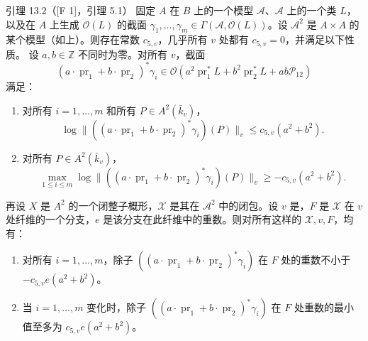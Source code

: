 \begin{statement}{引理 13.2（[F 1]，引理 5.1）}
固定 $A$ 在 $B$ 上的一个模型 $\mathscr A$、$\mathscr A$ 上的一个类 $L$，以及在 $A$ 上生成 $\mathcal O(L)$ 的截面 $\gamma_1,\ldots,\gamma_m\in\Gamma(\mathscr A,\mathcal O(L))$。设 $\mathscr A^2$ 是 $A\times A$ 的某个模型（如上）。则存在常数 $c_{5,v}$，几乎所有 $v$ 处都有 $c_{5,v}=0$，并满足以下性质。
设 $a,b\in\mathbb Z$ 不同时为零。对所有 $v$，截面
\[
(a\cdot\operatorname{pr}_1+b\cdot\operatorname{pr}_2)^*\gamma_i
\in\mathcal O(a^2\operatorname{pr}_1^*L+b^2\operatorname{pr}_2^*L+ab\mathscr P_{12})
\]
满足：
\begin{enumerate}[label=(\alph*).]
\item 对所有 $i=1,\ldots,m$ 和所有 $P\in A^2(\bar k_v)$，
\[
\log\|((a\cdot\operatorname{pr}_1+b\cdot\operatorname{pr}_2)^*\gamma_i)(P)\|_v\le c_{5,v}(a^2+b^2).
\]
\item 对所有 $P\in A^2(\bar k_v)$，
\[
\max_{1\le i\le m}\log\|((a\cdot\operatorname{pr}_1+b\cdot\operatorname{pr}_2)^*\gamma_i)(P)\|_v\ge-c_{5,v}(a^2+b^2).
\]
\end{enumerate}
再设 $X$ 是 $A^2$ 的一个闭整子概形，$\mathscr X$ 是其在 $\mathscr A^2$ 中的闭包。设 $v$ 是，$F$ 是 $\mathscr X$ 在 $v$ 处纤维的一个分支，$e$ 是该分支在此纤维中的重数。则对所有这样的 $\mathscr X,v,F$，均有：
\begin{enumerate}[label=(\alph*).,start=3]
\item 对所有 $i=1,\ldots,m$，除子 $((a\cdot\operatorname{pr}_1+b\cdot\operatorname{pr}_2)^*\gamma_i)$ 在 $F$ 处的重数不小于 $-c_{5,v}e(a^2+b^2)$。
\item 当 $i=1,\ldots,m$ 变化时，除子 $((a\cdot\operatorname{pr}_1+b\cdot\operatorname{pr}_2)^*\gamma_i)$ 在 $F$ 处重数的最小值至多为 $c_{5,v}e(a^2+b^2)$。
\end{enumerate}
\end{statement}
